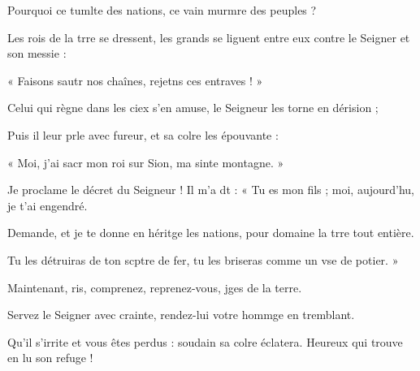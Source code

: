 \item Pourquoi ce tumlte des nations,\psstar{} ce vain murmre des peuples ?
\item Les rois de la trre se dressent,\psstar{} les grands se liguent entre eux contre le Seigner et son messie :
\item « Faisons sautr nos chaînes,\psstar{} rejetns ces entraves ! »
\item Celui qui règne dans les ciex s’en amuse,\psstar{} le Seigneur les torne en dérision ;
\item Puis il leur prle avec fureur,\psstar{} et sa colre les épouvante :
\item « Moi, j’ai sacr mon roi\psstar{} sur Sion, ma sinte montagne. »
\item Je proclame le décret du Seigneur !\pscross{} Il m’a dt : « Tu es mon fils ;\psstar{} moi, aujourd’hu, je t’ai engendré.
\item Demande, et je te donne en héritge les nations,\psstar{} pour domaine la trre tout entière.
\item Tu les détruiras de ton scptre de fer,\psstar{} tu les briseras comme un vse de potier. »
\item Maintenant, ris, comprenez,\psstar{} reprenez-vous, jges de la terre.
\item Servez le Seigner avec crainte,\psstar{} rendez-lui votre hommge en tremblant.
\item Qu’il s’irrite et vous êtes perdus :\pscross{} soudain sa colre éclatera.\psstar{} Heureux qui trouve en lu son refuge !
